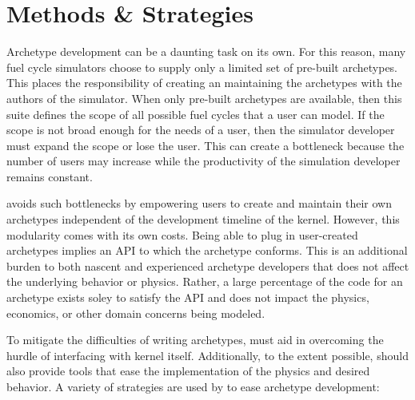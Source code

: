 \section{Methods \& Strategies}
\label{sec-methods}

Archetype development can be a daunting task on its own. For this reason, 
many fuel cycle simulators choose to supply only a limited set of 
pre-built archetypes. This places the responsibility of creating an maintaining 
the archetypes with the authors of the simulator.  When only pre-built archetypes are available, then this suite defines the scope 
of all possible fuel cycles that a user can model. If the scope is not broad 
enough for the needs of a user, then the simulator developer must expand the 
scope or lose the user.  This can create a bottleneck because the number of users 
may increase while the productivity of the simulation developer remains constant.

\Cyclus avoids such bottlenecks by empowering users to create and maintain 
their own archetypes independent of the development timeline of the \cyclus 
kernel. However, this modularity comes with its own costs. Being able to 
plug in user-created archetypes implies an \gls{API} to which 
the archetype conforms. This is an 
additional burden to both nascent and experienced archetype developers that 
does not affect the underlying behavior or physics. Rather, a large percentage of the
code for an archetype exists soley to satisfy the \cyclus \gls{API} and does not
impact the physics, economics, or other domain concerns being modeled.

To mitigate the difficulties of writing archetypes, 
\cyclus must aid in overcoming the hurdle of interfacing with 
kernel itself. Additionally, to the extent possible, \cyclus should 
also provide tools that 
ease the implementation of the physics and desired behavior. 
A variety of strategies are used by \cyclus to ease archetype development: 


